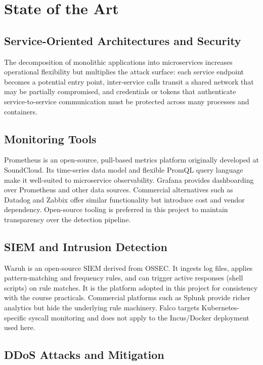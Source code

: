 \section{State of the Art}
\label{sec:stateoftheart}

\subsection{Service-Oriented Architectures and Security}

The decomposition of monolithic applications into microservices
increases operational flexibility but multiplies the attack surface: each service endpoint
becomes a potential entry point, inter-service calls transit a shared network that may be
partially compromised, and credentials or tokens that authenticate service-to-service
communication must be protected across many processes and containers.

\subsection{Monitoring Tools}

Prometheus is an open-source, pull-based metrics platform originally developed
at SoundCloud. Its time-series data model and flexible PromQL query
language make it well-suited to microservice observability. Grafana
provides dashboarding over Prometheus and other data sources. Commercial alternatives
such as Datadog and Zabbix offer similar functionality but introduce cost and vendor
dependency. Open-source tooling is preferred in this project to maintain transparency
over the detection pipeline.

\subsection{SIEM and Intrusion Detection}

Wazuh is an open-source SIEM derived from OSSEC. It ingests
log files, applies pattern-matching and frequency rules, and can trigger active responses
(shell scripts) on rule matches. It is the platform adopted in this project for
consistency with the course practicals. Commercial platforms such as Splunk provide
richer analytics but hide the underlying rule machinery. Falco targets
Kubernetes-specific syscall monitoring and does not apply to the Incus/Docker
deployment used here.

\subsection{DDoS Attacks and Mitigation}

